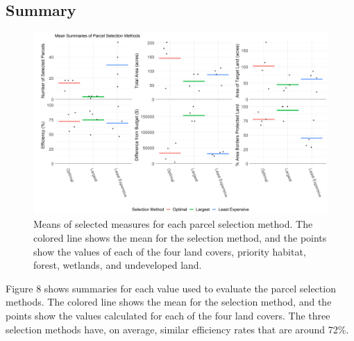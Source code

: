\documentclass[12pt, stu, floatsintext,table]{apa7}
\begin{document}
\begin{table}[hbtp]
\caption{Summary of selected undeveloped parcels.} 
\end{table}
\subsection{Summary}
\begin{figure}[hbtp]
    \centering
    \includegraphics[width = \textwidth]{figures/summary.png}
    \caption{Means of selected measures for each parcel selection method. The colored line shows the mean for the selection method, and the points show the values of each of the four land covers, priority habitat, forest, wetlands, and undeveloped land. }
\end{figure}
Figure 8 shows summaries for each value used to evaluate the parcel selection methods. The colored line shows the mean for the selection method, and the points show the values calculated for each of the four land covers. The three selection methods have, on average, similar efficiency rates that are around 72\%. 
\end{document}
